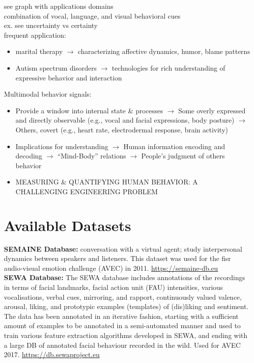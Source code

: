 see graph with applications domains\\
combination of vocal, language, and visual behavioral cues\\
ex. see uncertainty vs certainty\\
frequent application: 
\begin{itemize}
    \item marital therapy $\rightarrow$ characterizing affective dynamics, humor, blame patterns
    \item Autism spectrum disorders $\rightarrow$ technologies for rich understanding of expressive behavior and interaction
\end{itemize}

Multimodal behavior signals:\\
\begin{itemize}
    \item Provide a window into internal state \& processes $\rightarrow$ Some overly expressed and directly observable (e.g., vocal and facial expressions, body posture)
$\rightarrow$ Others, covert
(e.g., heart rate, electrodermal response, brain activity) 
    \item Implications for understanding $\rightarrow$ Human information encoding and decoding $\rightarrow$ “Mind-Body” relations
$\rightarrow$ People’s judgment of others behavior
    \item MEASURING \& QUANTIFYING HUMAN BEHAVIOR: A CHALLENGING ENGINEERING PROBLEM
\end{itemize}


\section{Available Datasets}

\textbf{SEMAINE Database: }
conversation with a virtual agent; study interpersonal dynamics between
speakers and listeners. This dataset was used for the fisr audio-visual emotion challenge (AVEC) in 2011. \url{https://semaine-db.eu}\\

\textbf{SEWA Database: }
The SEWA database includes annotations of the recordings in terms of facial landmarks, facial action unit (FAU) intensities, various vocalisations, verbal cues, mirroring, and rapport, continuously valued valence, arousal, liking, and prototypic examples (templates) of (dis)liking and sentiment. The data has been annotated in an iterative fashion, starting with a sufficient amount of examples to be annotated in a semi-automated manner and used to train various feature extraction algorithms developed in SEWA, and ending with a large DB of annotated facial behaviour recorded in the wild. Used for AVEC 2017. \url{https://db.sewaproject.eu}\\

